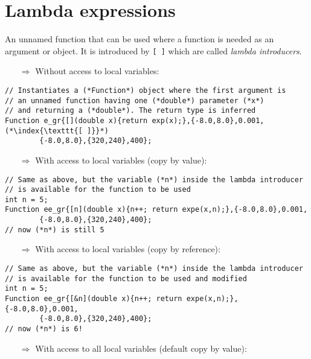 \documentclass[10pt]{article}
\begin{document}
\section{Lambda expressions}
\small
An unnamed function that can be used where a function is needed as an argument or object.
It is introduced by \texttt{[ ]} which are called \emph{lambda introducers}.
\begin{enumerate}
\item[$\Rightarrow$] Without access to local variables:
\end{enumerate}
\begin{lstlisting}
// Instantiates a (*Function*) object where the first argument is
// an unnamed function having one (*double*) parameter (*x*)
// and returning a (*double*). The return type is inferred
Function e_gr{[](double x){return exp(x);},{-8.0,8.0},0.001,(*\index{\texttt{[ ]}}*)
        {-8.0,8.0},{320,240},400};
\end{lstlisting}
\begin{enumerate}
\item[$\Rightarrow$] With access to local variables (copy by value):
\end{enumerate}
\begin{lstlisting}
// Same as above, but the variable (*n*) inside the lambda introducer
// is available for the function to be used
int n = 5;
Function ee_gr{[n](double x){n++; return expe(x,n);},{-8.0,8.0},0.001,
        {-8.0,8.0},{320,240},400};
// now (*n*) is still 5
\end{lstlisting}
\begin{enumerate}
\item[$\Rightarrow$] With access to local variables (copy by reference):
\end{enumerate}
\begin{lstlisting}
// Same as above, but the variable (*n*) inside the lambda introducer
// is available for the function to be used and modified
int n = 5;
Function ee_gr{[&n](double x){n++; return expe(x,n);},{-8.0,8.0},0.001,
        {-8.0,8.0},{320,240},400};
// now (*n*) is 6!
\end{lstlisting}
\begin{enumerate}
\item[$\Rightarrow$] With access to all local variables (default copy by value):
\end{enumerate}
\end{document}
